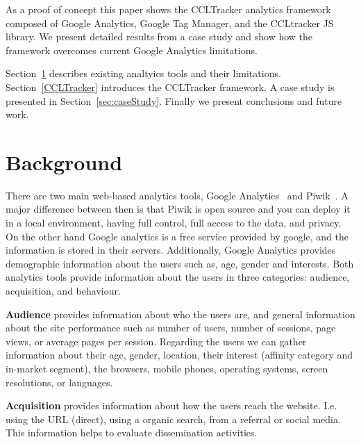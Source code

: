 \documentclass{article}
\begin{document}
As a proof of concept this paper shows the CCLTracker analytics framework composed of Google Analytics, Google Tag Manager, and the CCLtracker JS library. We present detailed results from a case study and show how the framework overcomes current Google Analytics limitations. 
 
Section~\ref{sec:related} describes existing analtyics tools and their limitations. Section~\ref{CCLTracker} introduces the CCLTracker framework. A case study is presented in Section~\ref{sec:caseStudy}. Finally we present conclusions and future work. 
 

\section{Background}\label{sec:related}


   
   
There are two main web-based analytics tools, Google Analytics~\cite{} and Piwik~\cite{}. A major difference between then is that Piwik is open source and you can deploy it in a local environment, having full control, full access to the data, and privacy. On the other hand Google analytics is a free service provided by google, and the information is stored in their servers. Additionally, Google Analytics provides demographic information about the users such as, age, gender and interests. Both analytics tools provide information about the users in three categories: audience, acquisition, and behaviour.

\textbf{Audience} provides information about who the users are, and general information about the site performance such as number of users, number of sessions, page views, or average pages per session. Regarding the users we can gather information about their age, gender, location, their interest (affinity category and in-market segment), the browsers, mobile phones, operating systems, screen resolutions, or languages. 
   
\textbf{Acquisition} provides information about how the users reach the website. I.e. using the URL (direct), using a organic search, from a referral or social media. This information helps to evaluate dissemination activities.   
\end{document}

